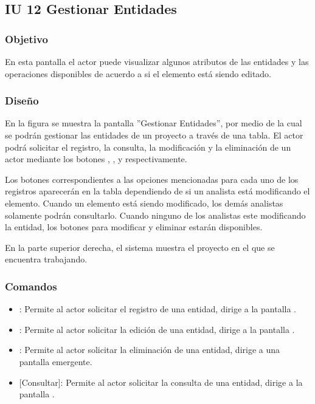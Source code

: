 \subsection{IU 12 Gestionar Entidades}

\subsubsection{Objetivo}
	En esta pantalla el actor puede visualizar algunos atributos de las entidades y las operaciones disponibles de acuerdo a si el elemento está siendo editado.
\subsubsection{Diseño}
	En la figura  se muestra la pantalla ''Gestionar Entidades'', por medio de la cual se podrán gestionar las entidades de un proyecto a través de una tabla. El actor podrá solicitar el registro, la consulta, la modificación y la eliminación de un actor mediante los botones , , \editar y \eliminar respectivamente.
	
	Los botones correspondientes a las opciones mencionadas para cada uno de los registros aparecerán en la tabla dependiendo de si un analista está modificando el elemento. Cuando un elemento está siendo modificado, los demás analistas solamente podrán consultarlo. Cuando ninguno de los analistas este modificando la entidad, los botones para modificar y eliminar estarán disponibles.
	
	En la parte superior derecha, el sistema muestra el proyecto en el que se encuentra trabajando.

\subsubsection{Comandos}
\begin{itemize}
	\item {}: Permite al actor solicitar el registro de una entidad, dirige a la pantalla .
	\item \editar [Modificar]: Permite al actor solicitar la edición de una entidad, dirige a la pantalla .
	\item \eliminar [Eliminar]: Permite al actor solicitar la eliminación de una entidad, dirige a una pantalla emergente.
	\item {} [Consultar]: Permite al actor solicitar la consulta de una entidad, dirige a la pantalla  .
\end{itemize}
